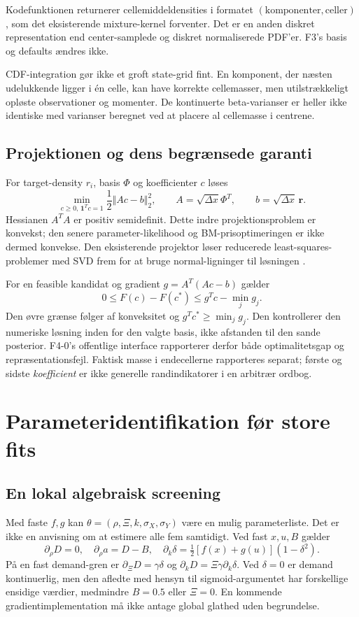 Kodefunktionen returnerer cellemiddeldensities i formatet \((\text{komponenter},\text{celler})\), som det eksisterende mixture-kernel forventer. Det er en anden diskret representation end center-samplede og diskret normaliserede PDF'er. F3's basis og defaults ændres ikke.

CDF-integration gør ikke et groft state-grid fint. En komponent, der næsten udelukkende ligger i én celle, kan have korrekte cellemasser, men utilstrækkeligt opløste observationer og momenter. De kontinuerte beta-varianser er heller ikke identiske med varianser beregnet ved at placere al cellemasse i centrene.

\subsection{Projektionen og dens begrænsede garanti}
For target-density \(r_i\), basis \(\Phi\) og koefficienter \(c\) løses
\begin{equation}
 \min_{c\geq0,\,\bm1^Tc=1}\frac12\Vert Ac-b\Vert_2^2,
 \qquad A=\sqrt{\Delta x}\Phi^T,\qquad b=\sqrt{\Delta x}\,\bm r.
 \label{eq:projection}
\end{equation}
Hessianen \(A^TA\) er positiv semidefinit. Dette indre projektionsproblem er konvekst; den senere parameter-likelihood og BM-prisoptimeringen er ikke dermed konvekse. Den eksisterende projektor løser reducerede least-squares-problemer med SVD frem for at bruge normal-ligninger til løsningen \cite{repo,nielsen}.

For en feasible kandidat og gradient \(g=A^T(Ac-b)\) gælder
\begin{equation}
 0\leq F(c)-F(c^*)\leq g^Tc-\min_jg_j.
 \label{eq:gap}
\end{equation}
Den øvre grænse følger af konveksitet og \(g^Tc^*\geq\min_jg_j\). Den kontrollerer den numeriske løsning inden for den valgte basis, ikke afstanden til den sande posterior. F4-0's offentlige interface rapporterer derfor både optimalitetsgap og repræsentationsfejl. Faktisk masse i endecellerne rapporteres separat; første og sidste \emph{koefficient} er ikke generelle randindikatorer i en arbitrær ordbog.

\section{Parameteridentifikation før store fits}
\subsection{En lokal algebraisk screening}
Med faste \(f,g\) kan \(\theta=(\rho,\Xi,k,\sigma_X,\sigma_Y)\) være en mulig parameterliste. Det er ikke en anvisning om at estimere alle fem samtidigt. Ved fast \(x,u,B\) gælder
\[
 \partial_\rho D=0,\quad \partial_\rho a=D-B,\quad
 \partial_k\delta=\tfrac12[f(x)+g(u)](1-\delta^2).
\]
På en fast demand-gren er \(\partial_\Xi D=\gamma\delta\) og \(\partial_kD=\Xi\gamma\partial_k\delta\). Ved \(\delta=0\) er demand kontinuerlig, men den afledte med hensyn til sigmoid-argumentet har forskellige ensidige værdier, medmindre \(B=0.5\) eller \(\Xi=0\). En kommende gradientimplementation må ikke antage global glathed uden begrundelse.

